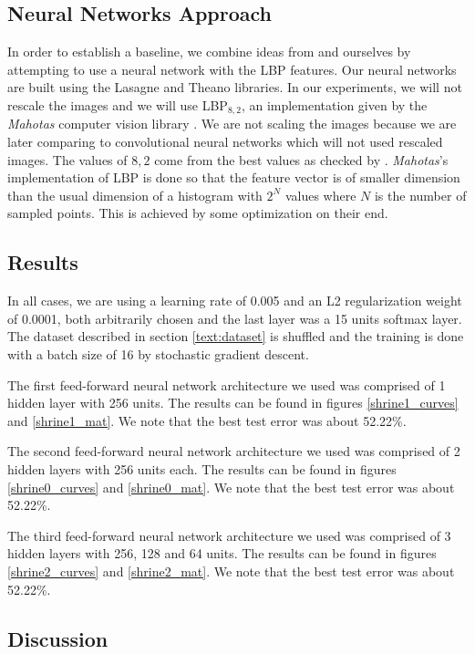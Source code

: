 \begin{multicols}{2}
\section{Neural Networks Approach}
In order to establish a baseline, we combine ideas from \citet{kylberg2011virus} and ourselves by attempting to use a neural network with the LBP features. Our neural networks are built using the Lasagne and Theano \cite{Bastien-Theano-2012, bergstra+al:2010-scipy} libraries. In our experiments, we will not rescale the images and we will use LBP$_{8,2}$, an implementation given by the \emph{Mahotas} computer vision library \citet{coelho2012mahotas}. We are not scaling the images because we are later comparing to convolutional neural networks which will not used rescaled images. The values of $8,2$ come from the best values as checked by \citet{kylberg2011virus}. \emph{Mahotas}'s implementation of LBP is done so that the feature vector is of smaller dimension than the usual dimension of a histogram with $2^N$ values where $N$ is the number of sampled points. This is achieved by some optimization on their end. 
\subsection{Results}
In all cases, we are using a learning rate of 0.005 and an L2 regularization weight of 0.0001, both arbitrarily chosen and the last layer was a 15 units softmax layer. The dataset described in section \ref{text:dataset} is shuffled and the training is done with a batch size of 16 by stochastic gradient descent. 

\par The first feed-forward neural network architecture we used was comprised of 1 hidden layer with 256 units. The results can be found in figures \ref{shrine1_curves} and \ref{shrine1_mat}. We note that the best test error was about 52.22\%. 


\par The second feed-forward neural network architecture we used was comprised of 2 hidden layers with 256 units each. The results can be found in figures \ref{shrine0_curves} and \ref{shrine0_mat}. We note that the best test error was about 52.22\%. 


\par The third feed-forward neural network architecture we used was comprised of 3 hidden layers with 256, 128 and 64 units. The results can be found in figures \ref{shrine2_curves} and \ref{shrine2_mat}. We note that the best test error was about 52.22\%. 


\subsection{Discussion}

\newpage


\end{multicols}

